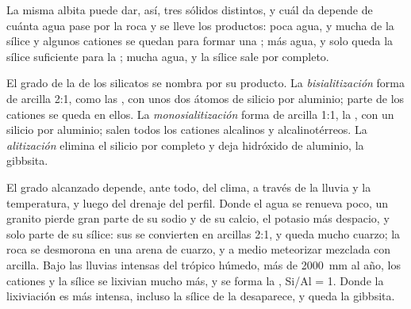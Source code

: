 La misma albita puede dar, así, tres sólidos distintos, y cuál da depende de cuánta agua pase por la roca y se lleve los productos: poca agua, y
mucha de la sílice y algunos cationes se quedan para formar una ; más agua, y solo queda la sílice suficiente para la ; mucha
agua, y la sílice sale por completo.

\begin{definition}\label{def:b1:weathering-clays:hydrolysis-degree}
El grado de la  de los silicatos se nombra por su producto.
La \emph{bisialitización} forma  de arcilla 2:1, como las , con unos dos átomos de silicio por
aluminio; parte de los cationes se queda en ellos. La \emph{monosialitización} forma  de arcilla 1:1, la
, con un silicio por aluminio; salen todos los cationes alcalinos y alcalinotérreos. La \emph{alitización} elimina
el silicio por completo y deja hidróxido de aluminio, la gibbsita.
\end{definition}

El grado alcanzado depende, ante todo, del clima, a través de la lluvia y la temperatura, y luego del drenaje del perfil. Donde el agua se renueva
poco, un granito pierde gran parte de su sodio y de su calcio, el potasio más despacio, y solo parte de su sílice: sus  se convierten en
arcillas 2:1, y queda mucho cuarzo; la roca se desmorona en una arena de cuarzo,  y  a medio meteorizar mezclada con arcilla. Bajo las
lluvias intensas del trópico húmedo, más de \qty{2000}{mm} al año, los cationes y la sílice se lixivian mucho más, y se forma la , Si/Al = 1.
Donde la lixiviación es más intensa, incluso la sílice de la  desaparece, y queda la gibbsita.

